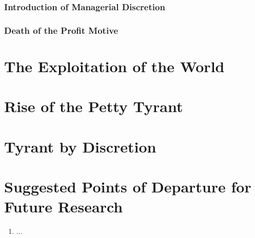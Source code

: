 \documentclass[12pt]{article}
\begin{document}
\subsubsection{Introduction of Managerial Discretion}
\subsubsection{Death of the Profit Motive}

\section{The Exploitation of the World}
\section{Rise of the Petty Tyrant}
\section{Tyrant by Discretion}

\section{Suggested Points of Departure for Future Research}


\begin{enumerate}
    \item ...
\end{enumerate}
\end{document}
